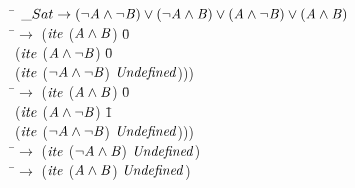\begin{subfigure}[t]{\textwidth}
  \begin{tabbing}
  \qquad \qquad \= $\_Sat \rightarrow (\neg \mathit{A}{} \wedge \neg \mathit{B}{}) \vee (\neg \mathit{A}{} \wedge \mathit{B}{}) \vee (\mathit{A}{} \wedge \neg \mathit{B}{}) \vee (\mathit{A}{} \wedge \mathit{B})$ \\
  \> \iV{}\quad\hspace{1.7ex}\=$\rightarrow$ ($\mathit{ite}$ ($\mathit{A}{} \wedge \mathit{B}{}$)\; \=0 \\
  \> \> \> ($\mathit{ite}$\; ($\mathit{A}{} \wedge \neg \mathit{B}{}$)\; \=0 \\
  \> \> \> \> ($\mathit{ite}$\; ($\neg \mathit{A}{} \wedge \neg \mathit{B}{}$) $\mathit{Undefined}$))) \\

  \> \cV{}\quad\hspace{1.7ex}\=$\rightarrow$ ($\mathit{ite}$ ($\mathit{A}{} \wedge \mathit{B}{}$)\; \=0 \\
  \> \> \> ($\mathit{ite}$\; ($\mathit{A}{} \wedge \neg \mathit{B}{}$)\; \=1 \\
  \> \> \> \> ($\mathit{ite}$\; ($\neg \mathit{A}{} \wedge \neg \mathit{B}{}$) $\mathit{Undefined}$))) \\

  \> \aV{}\quad\hspace{1.7ex}\=$\rightarrow$ ($\mathit{ite}$ ($\neg \mathit{A}{} \wedge \mathit{B}{}$)\; \tru{} $\mathit{Undefined}$)\\
  \> \bV{}\quad\hspace{1.7ex}\=$\rightarrow$ ($\mathit{ite}$ ($\mathit{A}{} \wedge \mathit{B}{}$) $\mathit{Undefined}$)
\end{tabbing}
\end{subfigure}
